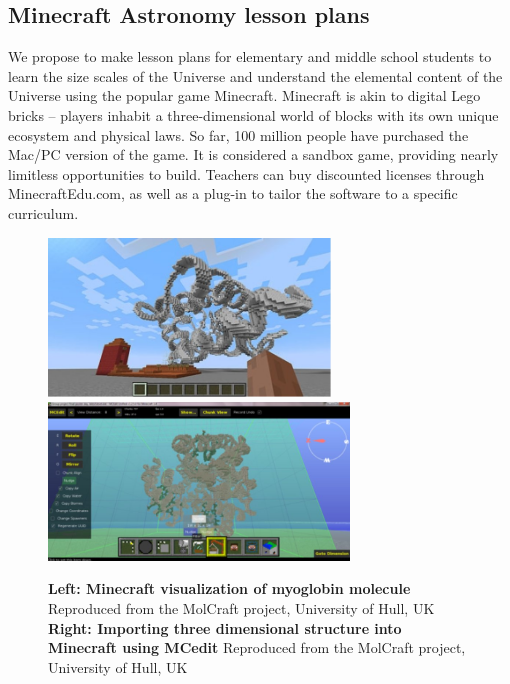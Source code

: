   

\subsection{Minecraft Astronomy lesson plans}




We propose to make lesson plans for elementary and middle school students to 
learn the size scales of the Universe and understand the elemental content 
of the Universe using the popular game Minecraft. 
Minecraft is akin to digital Lego bricks – players inhabit a 
three-dimensional 
world of blocks with its own unique ecosystem and physical laws.
So far, 100 million people have 
purchased 
the Mac/PC version of the game. 
It is considered a sandbox game, providing nearly limitless opportunities 
to  build. Teachers can buy discounted licenses through MinecraftEdu.com, as 
well as a plug-in to tailor the software to a specific curriculum. 



\begin{figure}%
\centering
\includegraphics[width=75mm]{figs/myoglobin.jpg}
\includegraphics[width=80mm]{figs/mcedit.jpg}
\caption{\footnotesize{{\bf Left:
Minecraft visualization of myoglobin molecule} 
Reproduced from the MolCraft project, University of Hull, UK
{\bf Right: Importing three dimensional structure into Minecraft
using MCedit} Reproduced from the MolCraft project, University of Hull, UK
}}
\label{molcraft}
\end{figure}


